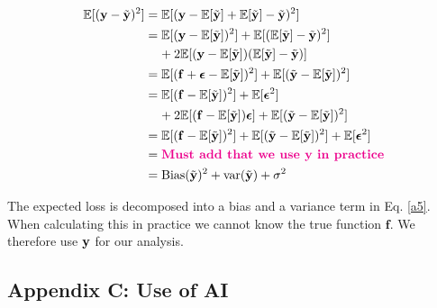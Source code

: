 \begin{align}\label{a5}
    \fv{(\mathbf{y}-\yt)^2} & = \fv{(\mathbf{y} - \fv{\yt} + \fv{\yt} -\yt)^2} \nonumber \\
    & = \fv{(\mathbf{y} - \fv{\yt})^2} + \fv{(\fv{\yt} -\yt)^2} \nonumber \\
    & \;\;\;\; + 2\fv{(\mathbf{y} - \fv{\yt})(\fv{\yt} -\yt)} \nonumber \\
    & = \fv{(\mathbf{f} + \boldsymbol{\epsilon} - \fv{\yt})^2} + \fv{(\yt - \fv{\yt})^2} \nonumber \\
    & = \fv{(\mathbf{f}-\fv{\yt})^2}+\fv{\boldsymbol{\epsilon}^2} \nonumber \\
    & \;\;\;\; + 2\fv{(\mathbf{f}-\fv{\yt})\boldsymbol{\epsilon}} + \fv{(\yt - \fv{\yt})^2}  \nonumber \\
    & = \fv{(\mathbf{f}-\fv{\yt})^2} + \fv{(\yt - \fv{\yt})^2} +\fv{\boldsymbol{\epsilon}^2}\nonumber \\
    & = \mia{Must add that we use y in practice} \nonumber \\
    & = \text{Bias}(\yt)^2 + \text{var}(\yt) + \sigma^2
\end{align}

The expected loss  is decomposed into a bias and a variance term in Eq. \ref{a5}. When calculating this in practice we cannot know the true function $\boldsymbol{f}$. We therefore use $\y$ for our analysis. 






\subsection{Appendix C: Use of AI} \label{appendixC}


